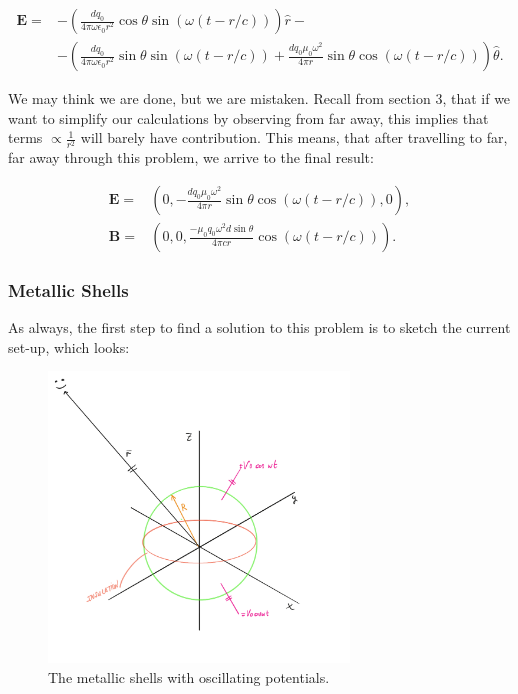 \begin{equation}
	\begin{split}
		\mathbf{E} = &-\left(\frac{d q_{0}}{4 \pi \omega \epsilon_{0} r^{2}}\cos\theta \sin\left(\omega(t-r/c)\right)\right) \hat{r} -\\
		&- \left(\frac{d q_{0}}{4 \pi \omega \epsilon_{0} r^{2}}\sin\theta \sin\left(\omega(t-r/c)\right) +\frac{d q_{0} \mu_{0}\omega^{2}}{4 \pi  r}\sin\theta \cos\left(\omega(t-r/c)\right)\right)\hat{\theta}.
	\end{split}
\end{equation}

We may think we are done, but we are mistaken. Recall from section 3, that if we want to simplify our calculations by observing from far away, this implies that terms $\propto \tfrac{1}{r^{2}}$ will barely have contribution. This means, that after travelling to far, far away through this problem, we arrive to the final result:

\begin{equation}
	\begin{split}
		\mathbf{E} = &\left(0, -\frac{d q_{0} \mu_{0}\omega^{2}}{4 \pi  r}\sin\theta \cos\left(\omega(t-r/c)\right),0\right),\\
		\mathbf{B} =& \left(0,0, \frac{-\mu_{0}q_{0}\omega^{2} d \sin\theta }{4\pi c r} \cos\left(\omega(t-r/c)\right)\right).
	\end{split}
\end{equation}

\subsubsection{Metallic Shells}\label{Metallic Shells}
As always, the first step to find a solution to this problem is to sketch the current set-up, which looks:

\begin{figure}[h]
	\includegraphics[width=8cm]{figures/Metallicshells.png}
	\centering
	\caption{The metallic shells with oscillating potentials.}
\end{figure}

